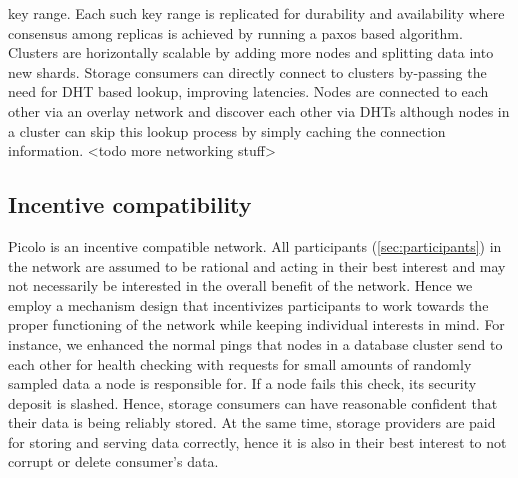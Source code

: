                                                                                                                                                                                                                                                                           {key range}. Each such key range is replicated for durability and availability where consensus among replicas is achieved by running a paxos based algorithm. Clusters are horizontally scalable by adding more nodes and splitting data into new shards. Storage consumers can directly connect to clusters by-passing the need for DHT based lookup, improving latencies.
\newline\newline
Nodes are connected to each other via an overlay network and discover each other via DHTs although nodes in a cluster can skip this lookup process by simply caching the connection information. <todo more networking stuff>

\subsection{Incentive compatibility}
\textsf{Picolo} is an incentive compatible network. All participants (\cref{sec:participants}) in the network are assumed to be rational and acting in their best interest and may not necessarily be interested in the overall benefit of the network. Hence we employ a mechanism design that incentivizes participants to work towards the proper functioning of the network while keeping individual interests in mind. For instance, we enhanced the normal pings that nodes in a database cluster send to each other for health checking with requests for small amounts of randomly sampled data a node is responsible for. If a node fails this check, its security deposit is slashed. Hence, storage consumers can have reasonable confident that their data is being reliably stored. At the same time, storage providers are paid for storing and serving data correctly, hence it is also in their best interest to not corrupt or delete consumer's data.

